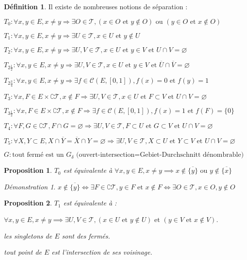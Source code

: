 \documentclass[a4paper, 11pt, french]{book}
\newenvironment{itemise}{\itemize}{\enditemize}
\theoremstyle{plain} %
\newtheorem{proposition}{Proposition}
\theoremstyle{definition} %
\newtheorem{definition}{Définition}
\theoremstyle{remark} %
\newtheorem*{demonstration}{Démonstration}
\newcommand{\1}{\mathds{1}}
\newcommand\vide{\varnothing}
\newcommand{\cont}{\mathcal{C}}
\newcommand\et{\text{ et }}
\newcommand\ou{\text{ ou }}
\begin{document}
\begin{definition}
	Il existe de nombreuses notions de séparation :
	\begin{itemise}
		\item $T_0:\forall x, y\in E, x\neq y\Rightarrow\exists O\in\mathscr{T}, (x\in O\et y\notin O)\ou(y\in O\et x\notin O)$
		\item $T_1:\forall x, y\in E, x\neq y\Rightarrow\exists U\in\mathscr{T}, x\in U\et y\notin U$
		\item $T_2:\forall x, y\in E, x\neq y\Rightarrow\exists U, V\in\mathscr{T}, x\in U\et y\in V\et U\cap V=\vide$
		\item $T_{2\frac{1}{2}}:\forall x, y\in E, x\neq y\Rightarrow\exists U, V\in\mathscr{T}, x\in U\et y\in V\et\overline{U}\cap\overline{V}=\vide$
		\item $T_{2\frac{3}{4}}:\forall x, y\in E, x\neq y\Rightarrow\exists f\in\cont(E, [0, 1]), f(x)=0\et f(y)=1$
		\item $T_3:\forall x, F\in E\times\complement\mathscr{T}, x\notin F\Rightarrow\exists U, V\in\mathscr{T}, x\in U\et F\subset V\et U\cap V=\vide$
		\item $T_{3\frac{1}{2}}:\forall x, F\in E\times\complement\mathscr{T}, x\notin F\Rightarrow\exists f\in\mathcal{C}(E, [0, 1]), f(x)=1\et f(F)=\{0\}$
		\item $T_4:\forall F, G\in\complement\mathscr{T}, F\cap G=\vide\Rightarrow\exists U, V\in\mathscr{T}, F\subset U\et G\subset V\et U\cap V=\vide$
		\item $T_5:\forall X, Y\subset E, X\cap\overline{Y}=\overline{X}\cap Y=\vide\Rightarrow\exists U, V\in\mathscr{T}, X\subset U\et Y\subset V\et U\cap V=\vide$
		\item $G:\text{tout fermé est un $G_\delta$ (ouvert-intersection=Gebiet-Durchschnitt dénombrable)}$
	\end{itemise}
\end{definition}

\begin{proposition}
	$T_0$ est équivalente à $\forall x, y\in E, x\neq y\implies x\notin\overline{\{y\}}\ou y\notin\overline{\{x\}}$
\end{proposition}

\begin{demonstration}
	$x\notin\overline{\{y\}}
		\iff\exists F\in\complement\mathscr{T}, y\in F\et x\notin F
		\iff\exists O\in\mathscr{T}, x\in O, y\notin O$
\end{demonstration}

\begin{proposition}
	$T_1$ est équivalente à :
	\begin{itemise}
		\item $\forall x, y\in E, x\neq y\implies\exists U, V\in\mathscr{T}, (x\in U\et y\notin U)\et(y\in V\et x\notin V)$.
		\item les singletons de $E$ sont des fermés.
		\item tout point de $E$ est l'intersection de ses voisinage.
	\end{itemise}
\end{proposition}
\end{document}
